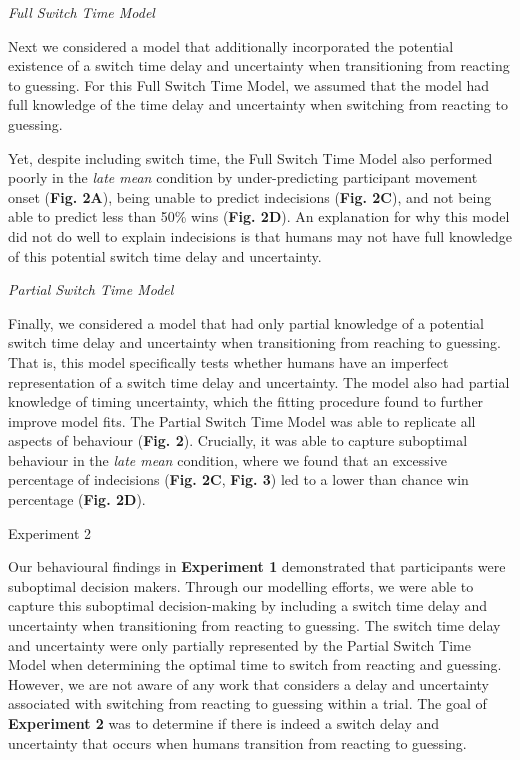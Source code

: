 \documentclass[12pt]{article}
\newcommand\boldblue[1]{\textcolor{mydarkblue}{\textbf{#1}}}
\newcommand{\SubSectionHeader}[1]{\noindent\Large{\textcolor{mydarkblue}{#1}}\normalsize }
\begin{document}
\vspace*{2mm}
\noindent\emph{{{Full Switch Time Model}}}

\noindent Next we considered a model that additionally incorporated the potential existence of a switch time delay and uncertainty when transitioning from reacting to guessing. For this Full Switch Time Model, we assumed that the model had full knowledge of the time delay and uncertainty when switching from reacting to guessing.

Yet, despite including switch time, the Full Switch Time Model also performed poorly in the \emph{late mean} condition by under-predicting participant movement onset (\boldblue{Fig. 2A}), being unable to predict indecisions (\boldblue{Fig. 2C}), and not being able to predict less than 50\% wins (\boldblue{Fig. 2D}). An explanation for why this model did not do well to explain indecisions is that humans may not have full knowledge of this potential switch time delay and uncertainty.

\vspace*{2mm}
\noindent\emph{{{Partial Switch Time Model}}}

\noindent Finally, we considered a model that had only partial knowledge of a potential switch time delay and uncertainty when transitioning from reaching to guessing. That is, this model specifically tests whether humans have an imperfect representation of a switch time delay and uncertainty. The model also had partial knowledge of timing uncertainty, which the fitting procedure found to further improve model fits. The Partial Switch Time Model was able to replicate all aspects of behaviour (\boldblue{Fig. 2}). Crucially, it was able to capture suboptimal behaviour in the \emph{late mean} condition, where we found that an excessive percentage of indecisions (\boldblue{Fig. 2C}, \boldblue{Fig. 3}) led to a lower than chance win percentage (\boldblue{Fig. 2D}).

\vspace{2mm}
\SubSectionHeader{Experiment 2}

\noindent Our behavioural findings in \boldblue{Experiment 1} demonstrated that participants were suboptimal decision makers. Through our modelling efforts, we were able to capture this suboptimal decision-making by including a switch time delay and uncertainty when transitioning from reacting to guessing. The switch time delay and uncertainty were only partially represented by the Partial Switch Time Model when determining the optimal time to switch from reacting and guessing. However, we are not aware of any work that considers a delay and uncertainty associated with switching from reacting to guessing within a trial. The goal of \boldblue{Experiment 2} was to determine if there is indeed a switch delay and uncertainty that occurs when humans transition from reacting to guessing.
\end{document}
